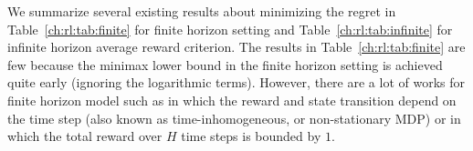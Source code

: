 We summarize several existing results about minimizing the regret in Table~\ref{ch:rl:tab:finite} for finite horizon setting and Table~\ref{ch:rl:tab:infinite} for infinite horizon average reward criterion.
The results in Table~\ref{ch:rl:tab:finite} are few because the minimax lower bound in the finite horizon setting is achieved quite early (ignoring the logarithmic terms).
However, there are a lot of works for finite horizon model such as  \cite{jin2018q, domingues2021episodic, li2021breaking} in which the reward and state transition depend on the time step (also known as time-inhomogeneous, or non-stationary MDP) or \cite{zanette2019tighter, zhang2021reinforcement} in which the total reward over $H$ time steps is bounded by $1$.

